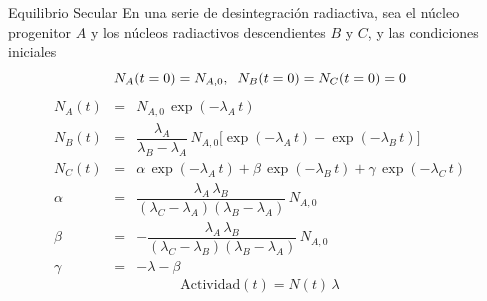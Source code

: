 \documentclass[9pt]{beamer}
\begin{document}
\begin{frame}[noframenumbering, label=EquilibrioSecular]{Equilibrio Secular}
En una serie de desintegración radiactiva, sea el núcleo progenitor $A$ y los núcleos radiactivos descendientes $B$ y $C$, y las condiciones iniciales
\begin{equation}
N_A(t=0) = N_{A,0}, \hspace{0.2cm} N_B(t=0) = N_C(t=0) = 0
\end{equation}
\begin{eqnarray}
N_A(t) &=& N_{A,0}\,\exp(-\lambda_A\,t) \\
N_B(t) &=& \dfrac{\lambda_A}{\lambda_B-\lambda_A}\,N_{A,0}\biggl[ \exp(-\lambda_A\,t) - \exp(-\lambda_B\,t) \biggr] \\
N_C(t) &=& \alpha\,\exp(-\lambda_A\,t) + \beta\,\exp(-\lambda_B\,t) + \gamma\,\exp(-\lambda_C\,t) \\
\alpha &=& \dfrac{\lambda_A\,\lambda_B}{(\lambda_C-\lambda_A)(\lambda_B-\lambda_A)}\,N_{A,0} \\
\beta &=& - \dfrac{\lambda_A\,\lambda_B}{(\lambda_C-\lambda_B)(\lambda_B-\lambda_A)} \,N_{A,0} \\
\gamma &=& -\lambda-\beta  
\end{eqnarray}
\begin{equation}
\text{Actividad}(t) = N(t)\,\lambda
\end{equation}
	\begin{flushright}
	\hyperlink{Portada}{}
	\end{flushright}
\end{frame}
\end{document}
